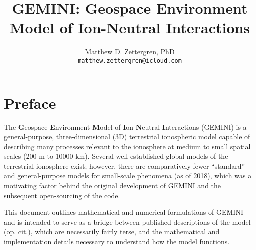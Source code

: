 \documentclass[11pt,letterpaper]{article}
\begin{document}
\setlength{\parindent}{0mm}
\setlength{\parskip}{0.4cm}




\title{\textbf{GEMINI}:  \textbf{G}eospace \textbf{E}nvironment \textbf{M}odel of \textbf{I}on-\textbf{N}eutral \textbf{I}nteractions}
\author{Matthew D. Zettergren, PhD\\ \texttt{matthew.zettergren@icloud.com}}
\maketitle

\tableofcontents

\pagebreak



\section{Preface}

The \textbf{G}eospace \textbf{E}nvironment \textbf{M}odel of \textbf{I}on-\textbf{N}eutral \textbf{I}nteractions (GEMINI) is a general-purpose, three-dimensional (3D) terrestrial ionospheric model capable of describing many processes relevant to the ionosphere at medium to small spatial scales (200 m to 10000 km).  Several well-established global models of the terrestrial ionosphere exist; however, there are comparatively fewer ``standard'' and general-purpose models for small-scale phenomena (as of 2018), which was a motivating factor behind the original development of GEMINI and the subsequent open-sourcing of the code.  


This document outlines mathematical and numerical formulations of GEMINI and is intended to serve as a bridge between published descriptions of the model (op. cit.), which are necessarily fairly terse, and the mathematical and implementation details necessary to understand how the model functions.  
\end{document}
